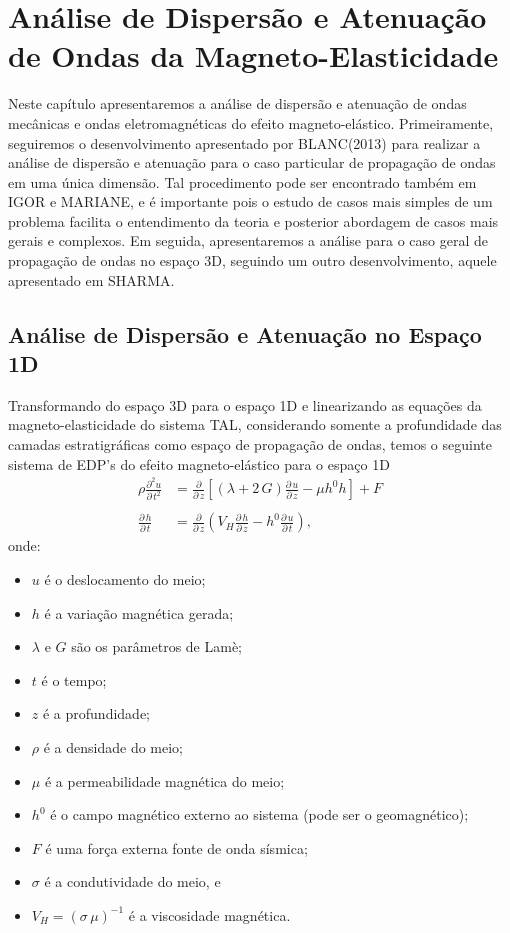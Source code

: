 \chapter{An\'alise de Dispers\~ao e Atenua\c{c}\~ao de Ondas da Magneto-Elasticidade}

Neste cap\'itulo apresentaremos a an\'alise de dispers\~ao e atenua\c{c}\~ao de ondas mec\^anicas e ondas eletromagn\'eticas do efeito magneto-el\'astico. Primeiramente, seguiremos o desenvolvimento apresentado por BLANC(2013) para realizar a an\'alise de dispers\~ao e atenua\c{c}\~ao para o caso particular de propaga\c{c}\~ao de ondas em uma \'unica dimens\~ao. Tal procedimento pode ser encontrado tamb\'em em IGOR e MARIANE, e \'e importante pois o estudo de casos mais simples de um problema facilita o entendimento da teoria e posterior abordagem de casos mais gerais e complexos. Em seguida, apresentaremos a an\'alise para o caso geral de propaga\c{c}\~ao de ondas no espa\c{c}o 3D, seguindo um outro desenvolvimento, aquele apresentado em SHARMA.

\section{An\'alise de Dispers\~ao e Atenua\c{c}\~ao no Espa\c{c}o 1D}

Transformando do espa\c{c}o 3D para o espa\c{c}o 1D e linearizando as equa\c{c}\~oes da magneto-elasticidade do sistema TAL, considerando somente a profundidade das camadas estratigr\'aficas como espa\c{c}o de propaga\c{c}\~ao de ondas, temos o seguinte sistema de EDP's do efeito magneto-el\'astico para o espa\c{c}o 1D
\begin{align}\label{eq.edp1}
\rho\frac{\partial^2u}{\partial\,t^2}&=\frac{\partial}{\partial\,z}\left[(\lambda+2\,G)\frac{\partial\,u}{\partial\,z}-\mu h^0h\right]+F\\\nonumber\\\label{eq.edp2}
\frac{\partial\,h}{\partial\,t}&=\frac{\partial}{\partial\,z}\left(V_H\frac{\partial\,h}{\partial\,z}-h^0\frac{\partial\,u}{\partial\,t}\right),
\end{align}
onde:
\begin{itemize}
\item $u$ \'e o deslocamento do meio;
\item $h$ \'e a varia\c{c}\~ao magn\'etica gerada;
\item $\lambda$ e $G$ s\~ao os par\^ametros de Lam\`e;
\item $t$ \'e o tempo;
\item $z$ \'e a profundidade;
\item $\rho$ \'e a densidade do meio;
\item $\mu$ \'e a permeabilidade magn\'etica do meio;
\item $h^0$ \'e o campo magn\'etico externo ao sistema (pode ser o geomagn\'etico);
\item $F$ \'e uma for\c{c}a externa fonte de onda s\'ismica;
\item $\sigma$ \'e a condutividade do meio, e
\item $V_H=(\sigma\,\mu)^{-1}$ \'e a viscosidade magn\'etica.
\end{itemize}

